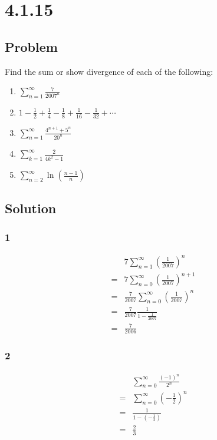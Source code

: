 \documentclass[12pt]{article}
\newcommand{\round}[1]{\left(       #1 \right)      }
\begin{document}
\section*{4.1.15}

\subsection*{Problem}
Find the sum or show divergence of each of the following:
\begin{enumerate}
    \item $\sum_{n = 1}^\infty \frac{7}{2007^n}$
    \item $1 - \frac{1}{2} + \frac{1}{4} - \frac{1}{8} + \frac{1}{16} - \frac{1}{32} + \cdots$
    \item $\sum_{n = 1}^\infty \frac{4^{n + 1} + 5^n}{20^n}$
    \item $\sum_{k = 1}^\infty \frac{2}{4k^2 - 1}$
    \item $\sum_{n=2}^\infty \ln\round{\frac{n-1}{n}}$
\end{enumerate}

\subsection*{Solution}

\subsubsection*{1}
\begin{align*}
     & 7 \sum_{n=1}^\infty \round{\frac{1}{2007}}^n \\
    =& 7 \sum_{n=0}^\infty \round{\frac{1}{2007}}^{n+1} \\
    =& \frac{7}{2007} \sum_{n=0}^\infty \round{\frac{1}{2007}}^n \\
    =& \frac{7}{2007} \frac{1}{1-\frac{1}{2007}} \\
    =& \frac{7}{2006}
\end{align*}

\subsubsection*{2}
\begin{align*}
     & \sum_{n=0}^\infty \frac{(-1)^n}{2^n} \\
    =& \sum_{n=0}^\infty \round{-\frac{1}{2}}^n \\
    =& \frac{1}{1 - \round{-\frac{1}{2}}} \\
    =& \frac{2}{3}
\end{align*}
\end{document}

